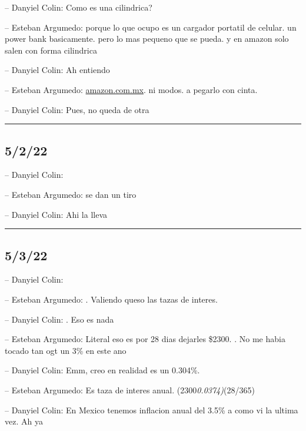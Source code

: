 -- Danyiel Colin: Como es una cilindrica?

-- Esteban Argumedo: porque lo que ocupo es un cargador portatil de
celular. un power bank basicamente. pero lo mas pequeno que se pueda. y
en amazon solo salen con forma cilindrica

-- Danyiel Colin: Ah entiendo

-- Esteban Argumedo:
\href{https://www.amazon.com.mx/Duracell-hasta-3050mAh-PowerBank-Copper/dp/B07W8S5MCW/ref=sr_1_2?__mk_es_MX=\%C3\%85M\%C3\%85\%C5\%BD\%C3\%95\%C3\%91\&crid=2V6UC4M8R6CB6\&keywords=mini\%2Bpower\%2Bbank\%2Bpi999\&qid=1651463575\&sprefix=mini\%2Bpower\%2Bbank\%2Bpi999\%2Caps\%2C108\&sr=8-2\&th=1}{amazon.com.mx}.
ni modos. a pegarlo con cinta.

-- Danyiel Colin: Pues, no queda de otra

\begin{center}\rule{0.5\linewidth}{0.5pt}\end{center}

\hypertarget{section-67}{%
\subsection{5/2/22}\label{section-67}}

-- Danyiel Colin:

-- Esteban Argumedo: se dan un tiro

-- Danyiel Colin: Ahi la lleva

\begin{center}\rule{0.5\linewidth}{0.5pt}\end{center}

\hypertarget{section-68}{%
\subsection{5/3/22}\label{section-68}}

-- Danyiel Colin:

-- Esteban Argumedo: . Valiendo queso las tazas de interes.

-- Danyiel Colin: . Eso es nada

-- Esteban Argumedo: Literal eso es por 28 dias dejarles \$2300. . No me
habia tocado tan ogt un 3\% en este ano

-- Danyiel Colin: Emm, creo en realidad es un 0.304\%.

-- Esteban Argumedo: Es taza de interes anual.
(2300\emph{0.0374)}(28/365)

-- Danyiel Colin: En Mexico tenemos inflacion anual del 3.5\% a como vi
la ultima vez. Ah ya

